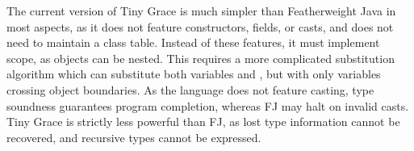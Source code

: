 \noindent The current version of Tiny Grace is much simpler than Featherweight
Java in most aspects, as it does not feature constructors, fields, or casts, and
does not need to maintain a class table. Instead of these features, it must
implement scope, as objects can be nested. This requires a more complicated
substitution algorithm which can substitute both variables and \self, but with
only variables crossing object boundaries. As the language does not feature
casting, type soundness guarantees program completion, whereas FJ may halt on
invalid casts. Tiny Grace is strictly less powerful than FJ, as lost type
information cannot be recovered, and recursive types cannot be expressed.


